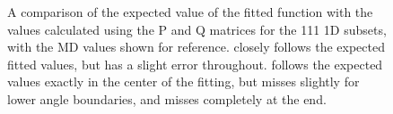 \documentclass[twoside,senior]{BYUPhys}
\begin{document}
\begin{figure}[ht!]
 \centering
 
 \quad
 \caption[Comparison of the PQ matrices with the expected result for \textlangle{}111\textrangle{} 1D subset.]{\label{appfig:111PQ} A comparison of the expected value of the fitted function with the values calculated using the P and Q matrices for the \textlangle{}111\textrangle{} 1D subsets, with the MD values shown for reference.  \protect{} closely follows the expected fitted values, but has a slight error throughout.  \protect{} follows the expected values exactly in the center of the fitting, but misses slightly for lower angle boundaries, and misses completely at the end.}
\end{figure}
\end{document}
